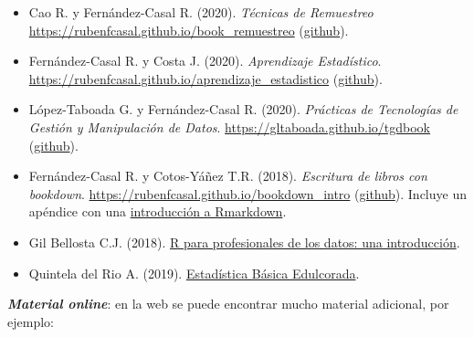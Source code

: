 \documentclass[
]{book}
\theoremstyle{break}
\theoremstyle{definition}
\theoremstyle{definition}
\theoremstyle{definition}
\theoremstyle{remark}
\begin{document}
\begin{itemize}
  \begin{itemize}
  \item
    Cao R. y Fernández-Casal R. (2020). \emph{Técnicas de Remuestreo} \url{https://rubenfcasal.github.io/book_remuestreo} (\href{https://github.com/rubenfcasal/book_remuestreo}{github}).
  \item
    Fernández-Casal R. y Costa J. (2020). \emph{Aprendizaje Estadístico}. \url{https://rubenfcasal.github.io/aprendizaje_estadistico} (\href{https://github.com/rubenfcasal/aprendizaje_estadistico}{github}).
  \item
    López-Taboada G. y Fernández-Casal R. (2020). \emph{Prácticas de Tecnologías de Gestión y Manipulación de Datos}. \url{https://gltaboada.github.io/tgdbook} (\href{https://github.com/gltaboada/tgdbook}{github}).
  \item
    Fernández-Casal R. y Cotos-Yáñez T.R. (2018). \emph{Escritura de libros con bookdown}. \url{https://rubenfcasal.github.io/bookdown_intro} (\href{https://github.com/rubenfcasal/bookdown_intro}{github}).
    Incluye un apéndice con una \href{https://rubenfcasal.github.io/bookdown_intro/rmarkdown.html}{introducción a Rmarkdown}.
  \item
    Gil Bellosta C.J. (2018). \href{https://www.datanalytics.com/libro_r/index.html}{R para profesionales de los datos: una introducción}.
  \item
    Quintela del Rio A. (2019). \href{https://bookdown.org/aquintela/EBE}{Estadística Básica Edulcorada}.
  \end{itemize}
\end{itemize}

\textbf{\emph{Material online}}:
en la web se puede encontrar mucho material adicional, por ejemplo:
\end{document}
